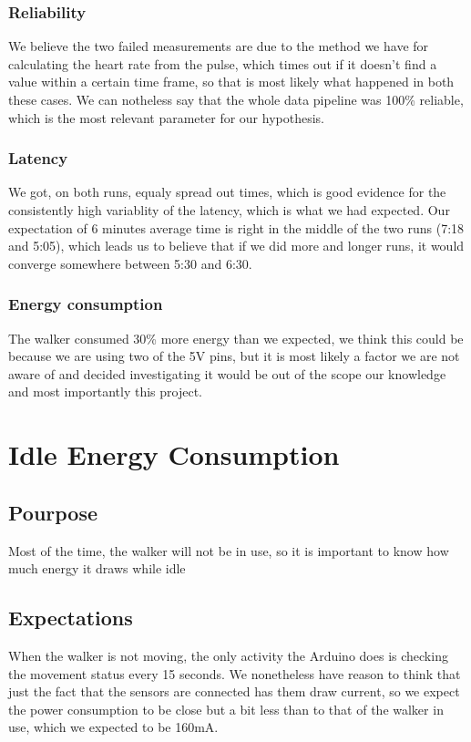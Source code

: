 		\subsubsection{Reliability}
			We believe the two failed measurements are due to the method we have for calculating the heart rate from the pulse, which times out if it doesn't find a value within a certain time frame, so that is most likely what happened in both these cases. We can notheless say that the whole data pipeline was 100\% reliable, which is the most relevant parameter for our hypothesis.

		\subsubsection{Latency}
			We got, on both runs, equaly spread out times, which is good evidence for the consistently high variablity of the latency, which is what we had expected. Our expectation of 6 minutes average time is right in the middle of the two runs (7:18 and 5:05), which leads us to believe that if we did more and longer runs, it would converge somewhere between 5:30 and 6:30.

		\subsubsection{Energy consumption}
			The walker consumed 30\% more energy than we expected, we think this could be because we are using two of the 5V pins, but it is most likely a factor we are not aware of and decided investigating it would be out of the scope our knowledge and most importantly this project.

\section{Idle Energy Consumption}

	\subsection{Pourpose}
		Most of the time, the walker will not be in use, so it is important to know how much energy it draws while idle
	\subsection{Expectations}
		When the walker is not moving, the only activity the Arduino does is checking the movement status every 15 seconds. We nonetheless have reason to think that just the fact that the sensors are connected has them draw current, so we expect the power consumption to be close but a bit less than to that of the walker in use, which we expected to be 160mA.
